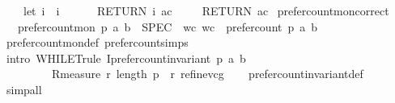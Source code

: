\begin{isabellebody}
\ \ \ \ let\ i\ {\isacharequal}{\kern0pt}\ i\ {\isacharplus}{\kern0pt}\ {}{\isacharsemicolon}{\kern0pt}\isanewline
\ \ \ \ RETURN\ {\isacharparenleft}{\kern0pt}i{\isacharcomma}{\kern0pt}\ ac{\isacharparenright}{\kern0pt}\isanewline
\ \ {\isacharbraceright}{\kern0pt}{\isacharparenright}{\kern0pt}{\isacharparenleft}{\kern0pt}{}{\isacharcomma}{\kern0pt}{}{\isacharparenright}{\kern0pt}{\isacharsemicolon}{\kern0pt}\isanewline
\ \ RETURN\ ac\isanewline
{\isacharbraceright}{\kern0pt}{\isachardoublequoteclose}\isanewline
\isanewline
{}\isamarkupfalse%
\ prefer{\isacharunderscore}{\kern0pt}count{\isacharunderscore}{\kern0pt}mon{\isacharunderscore}{\kern0pt}correct{\isacharcolon}{\kern0pt}\isanewline
\ \ \ {\isachardoublequoteopen}prefer{\isacharunderscore}{\kern0pt}count{\isacharunderscore}{\kern0pt}mon\ p\ a\ b\ {\isasymle}\ SPEC\ {\isacharparenleft}{\kern0pt}{\isasymlambda}\ wc{\isachardot}{\kern0pt}\ wc\ {\isacharequal}{\kern0pt}\ prefer{\isacharunderscore}{\kern0pt}count\ p\ a\ b{\isacharparenright}{\kern0pt}{\isachardoublequoteclose}\isanewline
%
\isadelimproof
\ \ %
\endisadelimproof
%
\isatagproof
{}\isamarkupfalse%
\ prefer{\isacharunderscore}{\kern0pt}count{\isacharunderscore}{\kern0pt}mon{\isacharunderscore}{\kern0pt}def\ prefer{\isacharunderscore}{\kern0pt}count{\isachardot}{\kern0pt}simps\isanewline
\ \ \isamarkupfalse%
\ {\isacharparenleft}{\kern0pt}intro\ WHILET{\isacharunderscore}{\kern0pt}rule{\isacharbrackleft}{\kern0pt}\ I{\isacharequal}{\kern0pt}{\isachardoublequoteopen}{\isacharparenleft}{\kern0pt}prefer{\isacharunderscore}{\kern0pt}count{\isacharunderscore}{\kern0pt}invariant\ p\ a\ b{\isacharparenright}{\kern0pt}{\isachardoublequoteclose}\isanewline
\ \ \ \ \ \ \ \ \ R{\isacharequal}{\kern0pt}{\isachardoublequoteopen}measure\ {\isacharparenleft}{\kern0pt}{\isasymlambda}{\isacharparenleft}{\kern0pt}r{\isacharcomma}{\kern0pt}{\isacharunderscore}{\kern0pt}{\isacharparenright}{\kern0pt}{\isachardot}{\kern0pt}\ {\isacharparenleft}{\kern0pt}length\ p{\isacharparenright}{\kern0pt}\ {\isacharminus}{\kern0pt}\ r{\isacharparenright}{\kern0pt}{\isachardoublequoteclose}{\isacharbrackright}{\kern0pt}\ refine{\isacharunderscore}{\kern0pt}vcg{\isacharparenright}{\kern0pt}\isanewline
\ \ \isamarkupfalse%
\ prefer{\isacharunderscore}{\kern0pt}count{\isacharunderscore}{\kern0pt}invariant{\isacharunderscore}{\kern0pt}def\isanewline
\ \ \isamarkupfalse%
\ {\isacharparenleft}{\kern0pt}simp{\isacharunderscore}{\kern0pt}all{\isacharparenright}{\kern0pt}\isanewline

\end{isabellebody}
